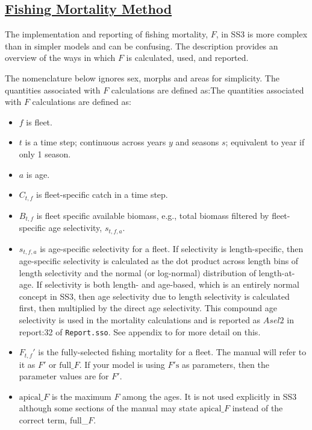 \hypertarget{FMethod}{}
\subsection[Fishing Mortality Method]{\protect\hyperlink{FMethod}{Fishing Mortality Method}}
The implementation and reporting of fishing mortality, $F$, in SS3 is more complex than in simpler models and can be confusing. The description provides an overview of the ways in which $F$ is calculated, used, and reported.


The nomenclature below ignores sex, morphs and areas for simplicity. The quantities associated with $F$ calculations are defined as:The quantities associated with $F$ calculations are defined as:

\begin{itemize}
	\item $f$ is fleet.
	\item $t$ is a time step; continuous across years $y$ and seasons $s$; equivalent to year if only 1 season.
	\item $a$ is age.
	\item $C_{t,f}$ is fleet-specific catch in a time step.
	\item $B_{t,f}$ is fleet specific available biomass, e.g., total biomass filtered by fleet-specific age selectivity, $s_{t,f,a}$.
	\item $s_{t,f,a}$ is age-specific selectivity for a fleet. If selectivity is length-specific, then age-specific selectivity is calculated as the dot product across length bins of length selectivity and the normal (or log-normal) distribution of length-at-age. If selectivity is both length- and age-based, which is an entirely normal concept in SS3, then age selectivity due to length selectivity is calculated first, then multiplied by the direct age selectivity. This compound age selectivity is used in the mortality calculations and is reported as $Asel2$ in report:32 of \texttt{Report.sso}. See appendix to \citet{methotstock2013} for more detail on this.
	\item $F_{t,f}'$ is the fully-selected fishing mortality for a fleet. The manual will refer to it as $F'$ or $\text{full\_}F$. If your model is using $F'\text{s}$ as parameters, then the parameter values are for $F'$.
	\item $\text{apical\_}F$ is the maximum $F$ among the ages. It is not used explicitly in SS3 although some sections of the manual may state $\text{apical\_}F$ instead of the correct term, full\_$F$.

\end{itemize}
